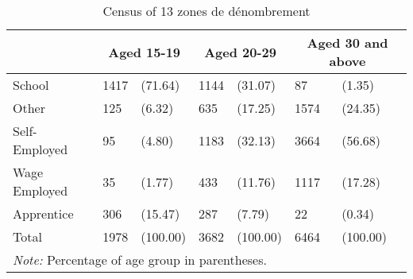 \begin{table}[htbp]\centering
\def\sym#1{\ifmmode^{#1}\else\(^{#1}\)\fi}
\caption{Census of 13 zones de dénombrement \label{tab:tbl-census}}
\begin{tabular}{l*{3}{ll}}
\toprule
            &\multicolumn{2}{c}{Aged 15-19}&\multicolumn{2}{c}{Aged 20-29}&\multicolumn{2}{c}{Aged 30 and above}\\
\midrule
School      &        1417&     (71.64)&        1144&     (31.07)&          87&      (1.35)\\
Other       &         125&      (6.32)&         635&     (17.25)&        1574&     (24.35)\\
Self-Employed&          95&      (4.80)&        1183&     (32.13)&        3664&     (56.68)\\
Wage Employed&          35&      (1.77)&         433&     (11.76)&        1117&     (17.28)\\
Apprentice  &         306&     (15.47)&         287&      (7.79)&          22&      (0.34)\\
Total       &        1978&    (100.00)&        3682&    (100.00)&        6464&    (100.00)\\
\bottomrule
\multicolumn{7}{l}{\footnotesize \textit{Note:} Percentage of age group in parentheses.}\\
\end{tabular}
\end{table}
